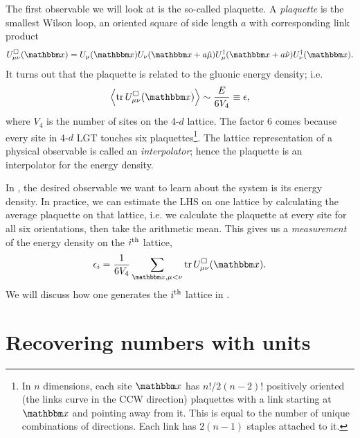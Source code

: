 The first observable we will look at is the so-called plaquette.
A
{\it plaquette} is the
smallest Wilson loop, an oriented square of side length $a$ with
corresponding link product
\begin{equation}
  \plaq_{\mu\nu}(\fvec{x})=U_\mu(\fvec{x})U_\nu(\fvec{x}+a\hat{\mu})
                        U^\dagger_\mu(\fvec{x}+a\hat{\nu})U^\dagger_\nu(\fvec{x}).
\end{equation}
It turns out that the plaquette is related to the gluonic energy density; i.e.
\begin{equation}\label{eq:edensity}
\ev{\tr\plaq_{\mu\nu}(\fvec{x})}\sim \frac{E}{6V_4}\equiv\epsilon,
\end{equation}
where $V_4$ is the number of sites on the 4-$d$ lattice. The factor 6 comes
because every site in 4-$d$ LGT touches six plaquettes\footnote{In $n$
dimensions, each site $\fvec{x}$ has $n!/2(n-2)!$ positively oriented (the links
curve in the CCW direction) plaquettes
with a link starting at $\fvec{x}$ and pointing away from it. This is equal to the
number of unique combinations of directions. Each link has $2(n-1)$ staples
attached to it.}. The lattice representation of a physical observable is called an {\it
interpolator}; hence the plaquette is an interpolator for the energy density.


In , the desired observable we want to learn about the
system is its energy density. In practice, we can estimate the LHS on one
lattice by calculating the average plaquette on that lattice, i.e. we calculate
the plaquette at every site for all six orientations, then take the arithmetic
mean. This gives us a {\it measurement} of the energy density on the $i{}^{\rm th}$
lattice,
\begin{equation}
\epsilon_i=\frac{1}{6V_4}\sum_{\fvec{x},\mu<\nu}\tr\plaq_{\mu\nu}(\fvec{x}).
\end{equation} 
We will discuss how one generates the $i{}^{\rm th}$ lattice in .



\section{Recovering numbers with units}

